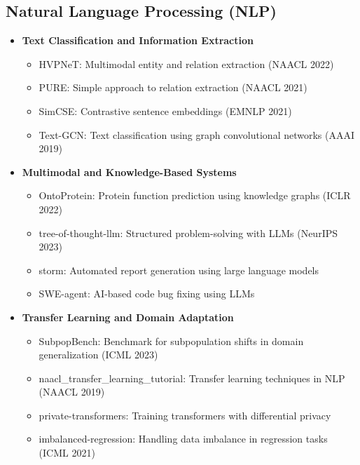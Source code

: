\vspace{-1em}
\subsection*{Natural Language Processing (NLP)}
\begin{itemize}
    \item \textbf{Text Classification and Information Extraction}
    \begin{itemize}
        \item HVPNeT: Multimodal entity and relation extraction (NAACL 2022)
        \item PURE: Simple approach to relation extraction (NAACL 2021)
        \item SimCSE: Contrastive sentence embeddings (EMNLP 2021)
        \item Text-GCN: Text classification using graph convolutional networks (AAAI 2019)
    \end{itemize}
    \item \textbf{Multimodal and Knowledge-Based Systems}
    \begin{itemize}
        \item OntoProtein: Protein function prediction using knowledge graphs (ICLR 2022)
        \item tree-of-thought-llm: Structured problem-solving with LLMs (NeurIPS 2023)
        \item storm: Automated report generation using large language models
        \item SWE-agent: AI-based code bug fixing using LLMs
    \end{itemize}
    \item \textbf{Transfer Learning and Domain Adaptation}
    \begin{itemize}
        \item SubpopBench: Benchmark for subpopulation shifts in domain generalization (ICML 2023)
        \item naacl\_transfer\_learning\_tutorial: Transfer learning techniques in NLP (NAACL 2019)
        \item private-transformers: Training transformers with differential privacy
        \item imbalanced-regression: Handling data imbalance in regression tasks (ICML 2021)
    \end{itemize}
\end{itemize}

